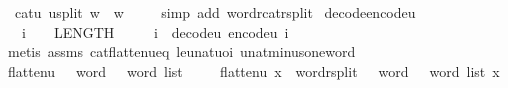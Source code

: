 \begin{isabellebody}
\ \ {\isachardoublequoteopen}cat{\isacharunderscore}{\kern0pt}u{}{}\ {\isacharparenleft}{\kern0pt}u{}{}{\isacharunderscore}{\kern0pt}split\ w{\isacharparenright}{\kern0pt}\ {\isacharequal}{\kern0pt}\ w{\isachardoublequoteclose}\ \isanewline
%
\isadelimproof
\ \ %
\endisadelimproof
%
\isatagproof
{}\isamarkupfalse%
\ {\isacharparenleft}{\kern0pt}simp\ add{\isacharcolon}{\kern0pt}\ word{\isacharunderscore}{\kern0pt}rcat{\isacharunderscore}{\kern0pt}rsplit{\isacharparenright}{\kern0pt}%
\endisatagproof
{\isafoldproof}%
%
\isadelimproof
\isanewline
%
\endisadelimproof
\isanewline
{}\isamarkupfalse%
\ decode{\isacharunderscore}{\kern0pt}encode{\isacharunderscore}{\kern0pt}u{}{}{\isacharcolon}{\kern0pt}\isanewline
\ \ \ {\isachardoublequoteopen}i\ {\isasymle}\ {}\ {\isacharcircum}{\kern0pt}\ LENGTH{\isacharparenleft}{\kern0pt}{}{}{\isacharparenright}{\kern0pt}\ {\isacharminus}{\kern0pt}\ {}{\isachardoublequoteclose}\isanewline
\ \ \ {\isachardoublequoteopen}i\ {\isacharequal}{\kern0pt}\ decode{\isacharunderscore}{\kern0pt}u{}{}\ {\isacharparenleft}{\kern0pt}encode{\isacharunderscore}{\kern0pt}u{}{}\ i{\isacharparenright}{\kern0pt}{\isachardoublequoteclose}\ \isanewline
%
\isadelimproof
\ \ %
\endisadelimproof
%
\isatagproof
{}\isamarkupfalse%
\ {\isacharparenleft}{\kern0pt}metis\ assms\ cat{\isacharunderscore}{\kern0pt}flatten{\isacharunderscore}{\kern0pt}u{}{}{\isacharunderscore}{\kern0pt}eq\ le{\isacharunderscore}{\kern0pt}unat{\isacharunderscore}{\kern0pt}uoi\ unat{\isacharunderscore}{\kern0pt}minus{\isacharunderscore}{\kern0pt}one{\isacharunderscore}{\kern0pt}word{\isacharparenright}{\kern0pt}%
\endisatagproof
{\isafoldproof}%
%
\isadelimproof
\isanewline
%
\endisadelimproof
\isanewline
{}\isamarkupfalse%
\ flatten{\isacharunderscore}{\kern0pt}u{}{}\ {\isacharcolon}{\kern0pt}{\isacharcolon}{\kern0pt}\ {\isachardoublequoteopen}{}{}\ word\ {\isasymRightarrow}\ {}\ word\ list{\isachardoublequoteclose}\isanewline
\ \ \isanewline
\ \ {\isachardoublequoteopen}flatten{\isacharunderscore}{\kern0pt}u{}{}\ x\ {\isasymequiv}\ {\isacharparenleft}{\kern0pt}word{\isacharunderscore}{\kern0pt}rsplit\ {\isacharcolon}{\kern0pt}{\isacharcolon}{\kern0pt}\ {}{}\ word\ {\isasymRightarrow}\ {}\ word\ list{\isacharparenright}{\kern0pt}\ x{\isachardoublequoteclose}\isanewline

\end{isabellebody}
